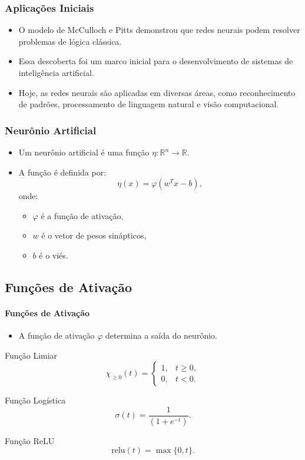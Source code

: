 \documentclass{beamer}
\begin{document}
\begin{frame}
\frametitle{Aplicações Iniciais}
\begin{itemize}
    \item O modelo de McCulloch e Pitts demonstrou que redes neurais podem resolver problemas de lógica clássica.
    \item Essa descoberta foi um marco inicial para o desenvolvimento de sistemas de inteligência artificial.
    \item Hoje, as redes neurais são aplicadas em diversas áreas, como reconhecimento de padrões, processamento de linguagem natural e visão computacional.
\end{itemize}
\end{frame}

\begin{frame}
\frametitle{Neurônio Artificial}
\begin{itemize}
    \item Um neurônio artificial é uma função \( \eta : \mathbb{R}^n \to \mathbb{R} \).
    \item A função é definida por:
    \[
    \eta(x) = \varphi(w^T x - b),
    \]
    onde:
    \begin{itemize}
        \item \( \varphi \) é a função de ativação,
        \item \( w \) é o vetor de pesos sinápticos,
        \item \( b \) é o viés.
    \end{itemize}
\end{itemize}
\end{frame}
\subsection{Funções de Ativação}
\begin{frame}
\framesubtitle{Funções de Ativação}
\footnotesize
\begin{itemize}
    \item A função de ativação \( \varphi \) determina a saída do neurônio.

\end{itemize}
\begin{block}{Função Limiar}
\[
\chi_{\geq 0}(t) =
\begin{cases}
1, & t \geq 0, \\
0, & t < 0.
\end{cases}
\]
\end{block}
\begin{block}{Função Logística}
\[
\sigma(t) = \frac{1}{(1 + e^{-t})}.
\]
\end{block}
\begin{block}{Função ReLU}
\[
\text{relu}(t) = \max\{0, t\}.
\]
\end{block}
\end{frame}
\end{document}
